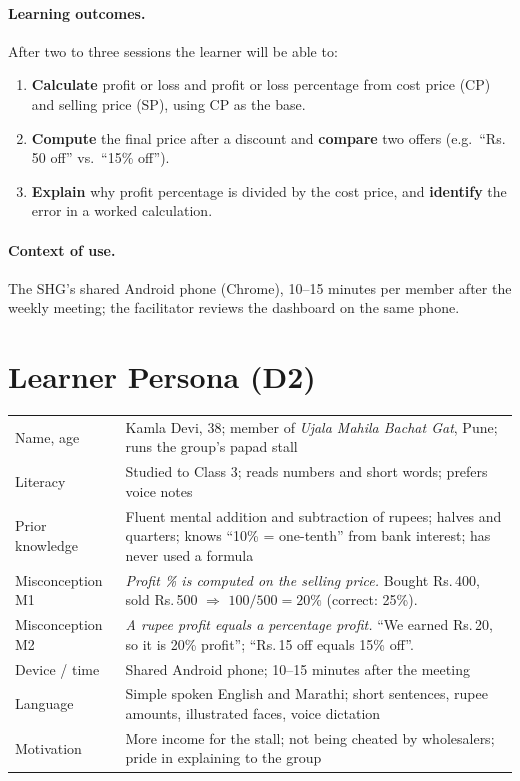 \documentclass[10pt,a4paper]{article}
\newcommand{\Rs}{Rs.\,}
\begin{document}
\paragraph{Learning outcomes.} After two to three sessions the learner will be able to:
\begin{enumerate}
\item \textbf{Calculate} profit or loss and profit or loss percentage from cost price (CP) and selling price (SP), using CP as the base.
\item \textbf{Compute} the final price after a discount and \textbf{compare} two offers (e.g.\ ``\Rs 50 off'' vs.\ ``15\% off'').
\item \textbf{Explain} why profit percentage is divided by the cost price, and \textbf{identify} the error in a worked calculation.
\end{enumerate}
\paragraph{Context of use.} The SHG's shared Android phone (Chrome), 10--15 minutes per member after the weekly meeting; the facilitator reviews the dashboard on the same phone.

\section{Learner Persona (D2)}
\begin{tabularx}{\linewidth}{@{}lY@{}}
\toprule
Name, age & Kamla Devi, 38; member of \emph{Ujala Mahila Bachat Gat}, Pune; runs the group's papad stall \\
Literacy & Studied to Class 3; reads numbers and short words; prefers voice notes \\
Prior knowledge & Fluent mental addition and subtraction of rupees; halves and quarters; knows ``10\% = one-tenth'' from bank interest; has never used a formula \\
Misconception M1 & \emph{Profit \% is computed on the selling price.} Bought \Rs 400, sold \Rs 500 $\Rightarrow$ $100/500 = 20\%$ (correct: 25\%). \\
Misconception M2 & \emph{A rupee profit equals a percentage profit.} ``We earned \Rs 20, so it is 20\% profit''; ``\Rs 15 off equals 15\% off''. \\
Device / time & Shared Android phone; 10--15 minutes after the meeting \\
Language & Simple spoken English and Marathi; short sentences, rupee amounts, illustrated faces, voice dictation \\
Motivation & More income for the stall; not being cheated by wholesalers; pride in explaining to the group \\
\bottomrule
\end{tabularx}
\end{document}
